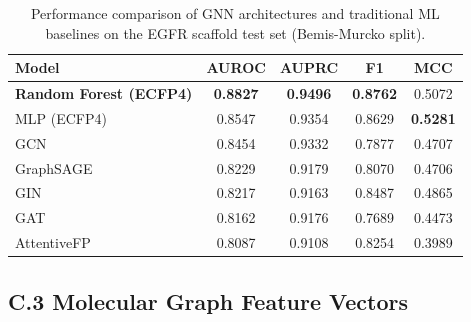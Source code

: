 \begin{table}[H]
\caption{Performance comparison of GNN architectures and
         traditional ML baselines on the EGFR scaffold test set
         (Bemis-Murcko split).}
\label{tab:app_model_compare}
\centering
\begin{tabular}{@{}lcccc@{}}
\toprule
\textbf{Model} & \textbf{AUROC} & \textbf{AUPRC}
               & \textbf{F1} & \textbf{MCC} \\
\midrule
\textbf{Random Forest (ECFP4)} & \textbf{0.8827} & \textbf{0.9496} & \textbf{0.8762} & 0.5072 \\
MLP (ECFP4)                & 0.8547 & 0.9354 & 0.8629 & \textbf{0.5281} \\
GCN                        & 0.8454 & 0.9332 & 0.7877 & 0.4707 \\
GraphSAGE                  & 0.8229 & 0.9179 & 0.8070 & 0.4706 \\
GIN                        & 0.8217 & 0.9163 & 0.8487 & 0.4865 \\
GAT                        & 0.8162 & 0.9176 & 0.7689 & 0.4473 \\
AttentiveFP                & 0.8087 & 0.9108 & 0.8254 & 0.3989 \\
\bottomrule
\end{tabular}
\end{table}

\subsection*{C.3 Molecular Graph Feature Vectors}

